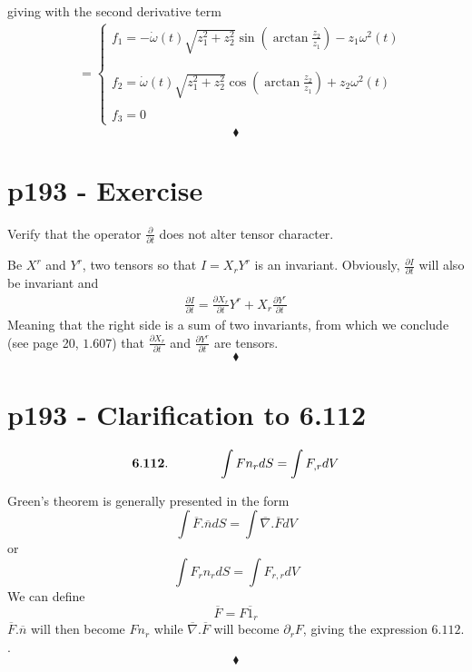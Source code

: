 giving with the second derivative term
\begin{align}
&=\left\{\begin{array}{l}
f_1 = -\dot{\omega}(t)\sqrt{z^{2}_1+z^{2}_2}\sin\left(\arctan\frac{z^{}_2}{z^{}_1}\right)-z_1\omega^2(t)\\\\\\
f_2 = \dot{\omega}(t)\sqrt{z^{2}_1+z^{2}_2}\cos\left(\arctan\frac{z^{}_2}{z^{}_1}\right)+z_2\omega^2(t)\\\\
f_3=0
\end{array}\right.
\end{align}
$$\blacklozenge$$
\newpage


\section{p193 - Exercise}
\begin{tcolorbox}
Verify that the operator $\frac{\partial}{\partial t}$ does not alter tensor character.
\end{tcolorbox}
Be $X^r$ and $Y^r$, two tensors so that $I=X_rY^r$ is an invariant. Obviously, $\frac{\partial I}{\partial t}$ will also be invariant and 
\begin{align}
\frac{\partial I}{\partial t}= \frac{\partial X_r}{\partial t}Y^r+X_r\frac{\partial Y^r}{\partial t}
\end{align}
Meaning that the right side is a sum of two invariants, from which we conclude (see page 20, $\mathbf{1.607}$) that $\frac{\partial X_r}{\partial t}$ and $\frac{\partial Y^r}{\partial t}$ are tensors.
$$\blacklozenge$$
\newpage

\section{p193 - Clarification to 6.112}
\begin{tcolorbox}
$$\mathbf{6.112.}\quad\quad\quad\quad \int Fn_rdS = \int F_{,r}dV$$
\end{tcolorbox}
Green's theorem is generally presented in the form
$$\int\overline{F}.\overline{n}dS = \int \overline{\nabla}. \overline{F}dV$$or
$$\int F_rn_rdS = \int F_{r,r}dV$$
We can define $$\overline{F} = F\overline{1}_r$$
 $\overline{F}.\overline{n}$  will then become $Fn_r$ while $\overline{\nabla}. \overline{F}$ will become $\partial_r F$, giving the expression $\mathbf{6.112.}$.
 $$\blacklozenge$$
\newpage




